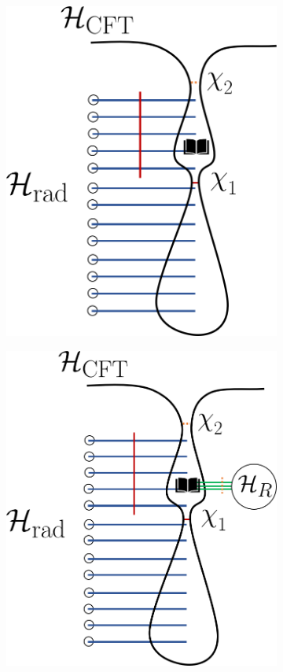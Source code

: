 \documentclass[11pt,a4paper]{article}
\begin{document}
\begin{figure}[t]
\begin{subfigure}{.48\textwidth}
  \centering
 \includegraphics[width = 0.8\linewidth]{Evaporation_LargeDiary.png}
\end{subfigure}
\begin{subfigure}{.48\textwidth}
  \centering
 \includegraphics[width = 0.8\linewidth]{Evaporation_LargeDiary_Reference.png}

\end{subfigure}
\end{figure}
\end{document}
